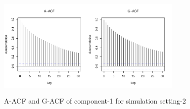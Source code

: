 \documentclass[11pt]{article}
\theoremstyle{remark}
\begin{document}
\begin{figure}
    \centering
    \includegraphics[width = 0.8\textwidth, height = 2in ]{plots/boom-acf_1_10_7_n1000.pdf}
    \caption{A-ACF and G-ACF of component-1 for simulation setting-2}
    \label{fig:boom-acf_1_10_7_n1e3}
\end{figure}
\end{document}
